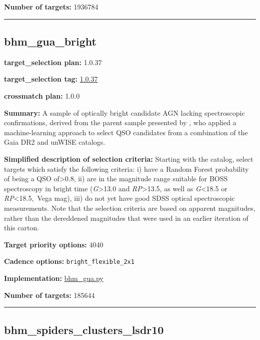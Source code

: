 \noindent\textbf{Number of targets:} 1936784

\begin{center}\rule{0.5\linewidth}{0.5pt}\end{center}

\hypertarget{bhm_gua_bright_plan1.0.37}{%
\subsection{bhm\_gua\_bright}\label{bhm_gua_bright_plan1.0.37}}

\noindent\textbf{target\_selection plan:} 1.0.37

\noindent\textbf{target\_selection tag:}
\href{https://github.com/sdss/target_selection/tree/1.0.37/}{1.0.37}

\noindent\textbf{crossmatch plan:} 1.0.0

\noindent\textbf{Summary:} A sample of optically bright candidate AGN lacking
spectroscopic confirmations, derived from the parent sample presented by
\citet{Shu2019}, who applied a machine-learning approach to select QSO
candidates from a combination of the Gaia DR2 and unWISE catalogs.

\noindent\textbf{Simplified description of selection criteria:} Starting with the
\citet{Shu2019} catalog, select targets which satisfy the following
criteria: i) have a Random Forest probability of being a QSO
of\textgreater0.8, ii) are in the magnitude range suitable for BOSS
spectroscopy in bright time (\emph{G}\textgreater13.0 and
\emph{RP}\textgreater13.5, as well as \emph{G}\textless18.5 or
\emph{RP}\textless18.5,~Vega mag), iii) do not yet have good SDSS
optical spectroscopic measurements. Note that the selection criteria are
based on apparent magnitudes, rather than the dereddened magnitudes that
were used in an earlier iteration of this carton.


\noindent\textbf{Target priority options:} 4040

\noindent\textbf{Cadence options:} \texttt{bright\_flexible\_2x1}

\noindent\textbf{Implementation:}
\href{https://github.com/sdss/target_selection/blob/1.0.37/python/target_selection/cartons/bhm_gua.py}{bhm\_gua.py}

\noindent\textbf{Number of targets:} 185644

\begin{center}\rule{0.5\linewidth}{0.5pt}\end{center}

\hypertarget{bhm_spiders_clusters_lsdr10_plan1.0.37}{%
\subsection{bhm\_spiders\_clusters\_lsdr10}\label{bhm_spiders_clusters_lsdr10_plan1.0.37}}

